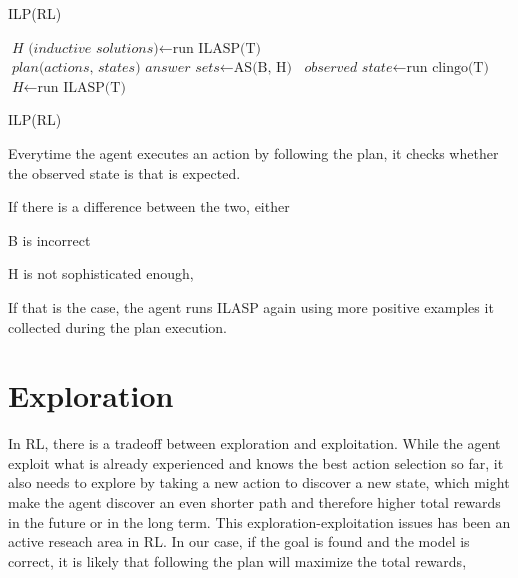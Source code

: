 \begin{algorithm}
\caption{ILP(RL)}\label{euclid}
\begin{algorithmic}[1]

    \State $\textit{H (inductive solutions)} \gets \text{run ILASP(T)}$
    \State $\textit{plan(actions, states) answer sets} \gets \text{AS(B, H)}$
        \State $\textit{observed state} \gets \text{run clingo(T)}$
            \State $\textit{H} \gets \text{run ILASP(T)}$
            \EndIf
    \EndWhile
\EndWhile

\EndProcedure
\caption{ILP(RL) }
\end{algorithmic}
\end{algorithm}

Everytime the agent executes an action by following the plan, it checks whether the observed state is that is expected.

If there is a difference between the two, either

B is incorrect

H is not sophisticated enough,

If that is the case, the agent runs ILASP again using more positive examples it collected during the plan execution.

\section{Exploration}
\label{exploration}

In RL, there is a tradeoff between exploration and exploitation. While the agent exploit what is already experienced and knows the best action selection so far, 
it also needs to explore by taking a new action to discover a new state, which might make the agent discover an even shorter path and therefore higher total rewards in the future or in the long term. 
This exploration-exploitation issues has been an active reseach area in RL. 
In our case, if the goal is found and the model is correct, it is likely that following the plan will maximize the total rewards, 

